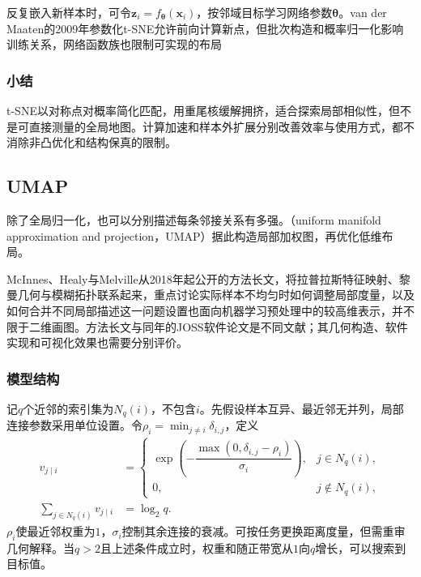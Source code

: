 反复嵌入新样本时，可令$\bm{z}_i=f_{\bm{\theta}}(\bm{x}_i)$，按邻域目标学习网络参数$\bm{\theta}$。van der Maaten的2009年参数化t-SNE允许前向计算新点，但批次构造和概率归一化影响训练关系，网络函数族也限制可实现的布局

\subsubsection{小结}

t-SNE以对称点对概率简化匹配，用重尾核缓解拥挤，适合探索局部相似性，但不是可直接测量的全局地图。计算加速和样本外扩展分别改善效率与使用方式，都不消除非凸优化和结构保真的限制。

\subsection{UMAP}
\label{sec:dim-umap}

除了全局归一化，也可以分别描述每条邻接关系有多强。（uniform manifold approximation and projection，UMAP）据此构造局部加权图，再优化低维布局。

McInnes、Healy与Melville从2018年起公开的方法长文，将拉普拉斯特征映射、黎曼几何与模糊拓扑联系起来，重点讨论实际样本不均匀时如何调整局部度量，以及如何合并不同局部描述这一问题设置也面向机器学习预处理中的较高维表示，并不限于二维画图。方法长文与同年的JOSS软件论文是不同文献；其几何构造、软件实现和可视化效果也需要分别评价。

\subsubsection{模型结构}

记$q$个近邻的索引集为$N_q(i)$，不包含$i$。先假设样本互异、最近邻无并列，局部连接参数采用单位设置。令$\rho_i=\min_{j\ne i}\delta_{i,j}$，定义
\begin{equation}
  \label{eq:dim-umap-directed}
  \begin{aligned}
    v_{j\mid i}
      &=
      \begin{cases}
        \exp\!\left(-\dfrac{\max(0,\delta_{i,j}-\rho_i)}
        {\sigma_i}\right),&j\in N_q(i),\\
        0,&j\notin N_q(i),
      \end{cases}\\
    \sum_{j\in N_q(i)}v_{j\mid i}&=\log_2 q.
  \end{aligned}
\end{equation}
$\rho_i$使最近邻权重为$1$，$\sigma_i$控制其余连接的衰减。可按任务更换距离度量，但需重审几何解释。当$q>2$且上述条件成立时，权重和随正带宽从$1$向$q$增长，可以搜索到目标值。

